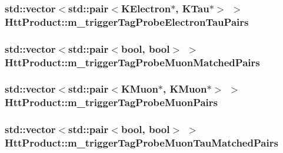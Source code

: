 \label{classHttProduct_acfac99f7abceb758f67853389752d1fb}
\hypertarget{classHttProduct_af58c919d7ebff1dbf5a0b062f4e093ae}{
\subsubsection[{m\_\-triggerTagProbeElectronTauPairs}]{\setlength{\rightskip}{0pt plus 5cm}std::vector$<$std::pair$<$KElectron$\ast$, KTau$\ast$$>$ $>$ {\bf HttProduct::m\_\-triggerTagProbeElectronTauPairs}}}
\label{classHttProduct_af58c919d7ebff1dbf5a0b062f4e093ae}
\hypertarget{classHttProduct_a3eedf80335cc6f6b9162db2c4228b1ea}{
\subsubsection[{m\_\-triggerTagProbeMuonMatchedPairs}]{\setlength{\rightskip}{0pt plus 5cm}std::vector$<$std::pair$<$bool, bool$>$ $>$ {\bf HttProduct::m\_\-triggerTagProbeMuonMatchedPairs}}}
\label{classHttProduct_a3eedf80335cc6f6b9162db2c4228b1ea}
\hypertarget{classHttProduct_a2222d478d3a8d53ab57680b6da314bf9}{
\subsubsection[{m\_\-triggerTagProbeMuonPairs}]{\setlength{\rightskip}{0pt plus 5cm}std::vector$<$std::pair$<$KMuon$\ast$, KMuon$\ast$$>$ $>$ {\bf HttProduct::m\_\-triggerTagProbeMuonPairs}}}
\label{classHttProduct_a2222d478d3a8d53ab57680b6da314bf9}
\hypertarget{classHttProduct_a14ce939d448152c742021f043fc8922b}{
\subsubsection[{m\_\-triggerTagProbeMuonTauMatchedPairs}]{\setlength{\rightskip}{0pt plus 5cm}std::vector$<$std::pair$<$bool, bool$>$ $>$ {\bf HttProduct::m\_\-triggerTagProbeMuonTauMatchedPairs}}}
